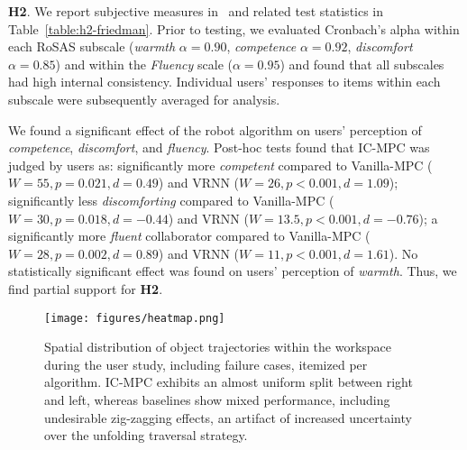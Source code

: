 \textbf{H2}. We report subjective measures in~ and related test statistics in Table~\ref{table:h2-friedman}. Prior to testing, we evaluated Cronbach's alpha within each RoSAS subscale (\emph{warmth} $\alpha=0.90$, \emph{competence} $\alpha=0.92$, \emph{discomfort} $\alpha=0.85$) and within the \emph{Fluency} scale ($\alpha=0.95$) and found that all subscales had high internal consistency.
Individual users' responses to items within each subscale were subsequently averaged for analysis.

\begin{table}
\centering
\caption{Friedman test results on subjective measures.\label{table:h2-friedman}}
\end{table}

We found a significant effect of the robot algorithm on users' perception of \emph{competence}, \emph{discomfort}, and \emph{fluency}.
Post-hoc tests found that IC-MPC was judged by users as: significantly more \emph{competent} compared to Vanilla-MPC ($W=55, p=0.021, d=0.49$) and VRNN ($W=26, p<0.001, d=1.09$); significantly less \emph{discomforting} compared to Vanilla-MPC ($W=30, p=0.018, d=-0.44$) and VRNN ($W=13.5, p<0.001, d=-0.76$); a significantly more \emph{fluent} collaborator compared to Vanilla-MPC ($W=28, p=0.002, d=0.89$) and VRNN ($W=11, p<0.001, d=1.61$).
No statistically significant effect was found on users' perception of \emph{warmth}.
Thus, we find partial support for \textbf{H2}.


\begin{figure*}
  \texttt{[image: figures/heatmap.png]}
  \caption{Spatial distribution of object trajectories within the workspace during the user study, including failure cases, itemized per algorithm. IC-MPC exhibits an almost uniform split between right and left, whereas baselines show mixed performance, including undesirable zig-zagging effects, an artifact of increased uncertainty over the unfolding traversal strategy.
  }
  \label{fig:qualitative-results}
\end{figure*}


